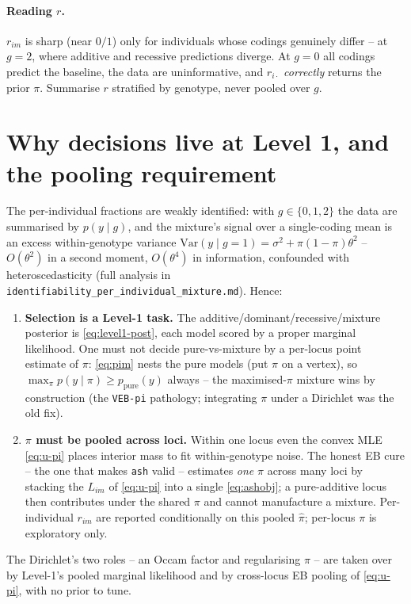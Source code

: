 \documentclass[11pt]{article}
\begin{document}
\paragraph{Reading $r$.} $r_{im}$ is sharp (near $0/1$) only for individuals
whose codings genuinely differ -- at $g=2$, where additive and recessive
predictions diverge. At $g=0$ all codings predict the baseline, the data are
uninformative, and $r_{i\cdot}$ \emph{correctly} returns the prior $\pi$.
Summarise $r$ stratified by genotype, never pooled over $g$.

\section{Why decisions live at Level 1, and the pooling requirement}
\label{sec:decisions}
The per-individual fractions are weakly identified: with $g\in\{0,1,2\}$ the data
are summarised by $p(y\mid g)$, and the mixture's signal over a single-coding
mean is an excess within-genotype variance
$\mathrm{Var}(y\mid g{=}1)=\sigma^2+\pi(1-\pi)\theta^2$ -- $O(\theta^2)$ in a
second moment, $O(\theta^4)$ in information, confounded with heteroscedasticity
(full analysis in \texttt{identifiability\_per\_individual\_mixture.md}). Hence:

\begin{enumerate}
\item \textbf{Selection is a Level-1 task.} The
additive/dominant/recessive/mixture posterior is \eqref{eq:level1-post}, each
model scored by a proper marginal likelihood. One must not decide pure-vs-mixture
by a per-locus point estimate of $\pi$: \eqref{eq:pim} nests the pure models (put
$\pi$ on a vertex), so $\max_\pi p(y\mid\pi)\ge p_{\mathrm{pure}}(y)$ always --
the maximised-$\pi$ mixture wins by construction (the \texttt{VEB-pi} pathology;
integrating $\pi$ under a Dirichlet was the old fix).
\item \textbf{$\pi$ must be pooled across loci.} Within one locus even the convex
MLE \eqref{eq:u-pi} places interior mass to fit within-genotype noise. The honest
EB cure -- the one that makes \texttt{ash} valid -- estimates \emph{one} $\pi$
across many loci by stacking the $L_{im}$ of \eqref{eq:u-pi} into a single
\eqref{eq:ashobj}; a pure-additive locus then contributes under the shared $\pi$
and cannot manufacture a mixture. Per-individual $r_{im}$ are reported
conditionally on this pooled $\hat\pi$; per-locus $\pi$ is exploratory only.
\end{enumerate}

\noindent The Dirichlet's two roles -- an Occam factor and regularising $\pi$ --
are taken over by Level-1's pooled marginal likelihood and by cross-locus EB
pooling of \eqref{eq:u-pi}, with no prior to tune.
\end{document}
